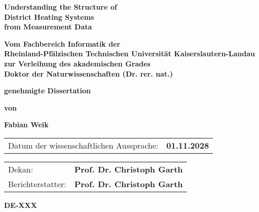 \begin{titlepage}
\begin{center}
        \phantom{x}
        \vspace{15mm}

        \linespread{1.2}
        \huge
        \textbf{
          Understanding the Structure of \\
          District Heating Systems \\
          from Measurement Data
        }

        \vspace{20mm}

        \linespread{1.5}
        \normalsize
        \textbf{
          Vom Fachbereich Informatik der \\
          Rheinland-Pfälzischen Technischen Universität Kaiserslautern-Landau \\
          zur Verleihung des akademischen Grades \\
          Doktor der Naturwissenschaften (Dr. rer. nat.)
        }

        \vspace{8mm}

        \textbf{
          genehmigte Dissertation
        }

        \vspace{5mm}

        \textbf{von}

        \vspace{5mm}

        \Large
        \textbf{Fabian Weik}
\end{center}

\vspace{15mm}
\begin{tabular}{ll}
  Datum der wissenschaftlichen Aussprache: & \textbf{01.11.2028} \\[1em]
\end{tabular}

\begin{tabular}{ll}
  Dekan: & \textbf{Prof. Dr. Christoph Garth} \\[0.5em]
  Berichterstatter: & \textbf{Prof. Dr. Christoph Garth}
\end{tabular}

\vfill

\begin{center}
        \textbf{DE-XXX}
\end{center}
\end{titlepage}
